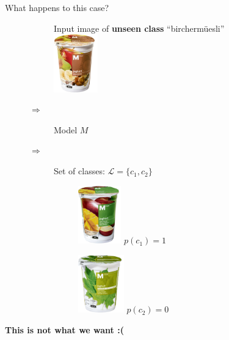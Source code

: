\documentclass{beamer}
\begin{document}
\begin{frame}{What happens to this case?}
\begin{figure}[H]
	\centering
	\begin{subfigure}{0.22\textwidth}
		\centering
		Input image  of \textbf{unseen class} ``birchermüesli''\\[.5cm]
		\includegraphics[height=2.5cm]{m-classic-joghurt-birchermueesli}
	\end{subfigure}$\Rightarrow$
	\begin{subfigure}{0.14\textwidth}
		\centering
		Model $M$
	\end{subfigure} $ \Rightarrow$
	\pause
	\begin{subfigure}{0.5\textwidth}
		\centering
		Set of classes:  $\mathcal{L}=\{c_1, c_2\}$\\ [.5cm]
		\begin{subfigure}{0.4\textwidth}
			\centering
			\includegraphics[height=2.5cm]{m-classic-joghurt-apfelmango}
			$p(c_1)=1$
		\end{subfigure}
		\begin{subfigure}{0.4\textwidth}
			\centering
			\includegraphics[height=2.5cm]{m-classic-joghurt-ahornsirup-stichfest} 
			$p(c_2)=0$
		\end{subfigure}
	\end{subfigure}
\end{figure}
\pause
\textbf{This is not what we want :(}
\end{frame}
\end{document}
